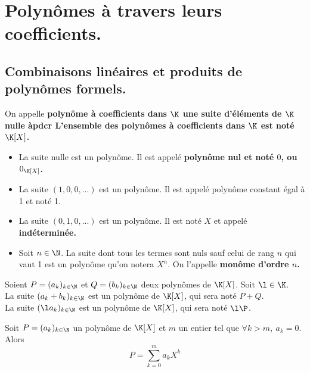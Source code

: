 \documentclass[11pt]{article}
\begin{document}


\thispagestyle{fancy}

\section{Polynômes à travers leurs coefficients.}

\subsection{Combinaisons linéaires et produits de polynômes formels.}

\begin{defi}{}{}
    On appelle \bf{polynôme} à coefficients dans $\K$ une suite d'éléments de $\K$ nulle àpdcr\n
    L'\bf{ensemble des polynômes} à coefficients dans $\K$ est noté $\K[X]$.
    \begin{itemize}
        \item La suite nulle est un polynôme. Il est appelé \bf{polynôme nul} et noté $0$, ou $0_{\K[X]}$.
        \item La suite $(1,0,0,...)$ est un polynôme. Il est appelé polynôme constant égal à 1 et noté 1.
        \item La suite $(0,1,0,...)$ est un polynôme. Il est noté $X$ et appelé \bf{indéterminée}.
        \item Soit $n\in\N$. La suite dont tous les termes sont nuls sauf celui de rang $n$ qui vaut 1 est un polynôme qu'on notera $X^n$. On l'appelle \bf{monôme} d'ordre $n$.
    \end{itemize}
\end{defi}

\begin{defi}{}{}
    Soient $P=(a_k)_{k\in\N}$ et $Q=(b_k)_{k\in\N}$ deux polynômes de $\K[X]$. Soit $\l\in\K$.\\
    La suite $(a_k+b_k)_{k\in\N}$ est un polynôme de $\K[X]$, qui sera noté $P+Q$.\\
    La suite $(\l a_k)_{k\in\N}$ est un polynôme de $\K[X]$, qui sera noté $\l\P$.
\end{defi}

\begin{corr}{}{}
    Soit $P=(a_k)_{k\in\N}$ un polynôme de $\K[X]$ et $m$ un entier tel que $\forall k > m, ~ a_k = 0$. Alors
    \begin{equation*}
        P=\sum_{k=0}^ma_kX^k
    \end{equation*}
\end{corr}
\end{document}
